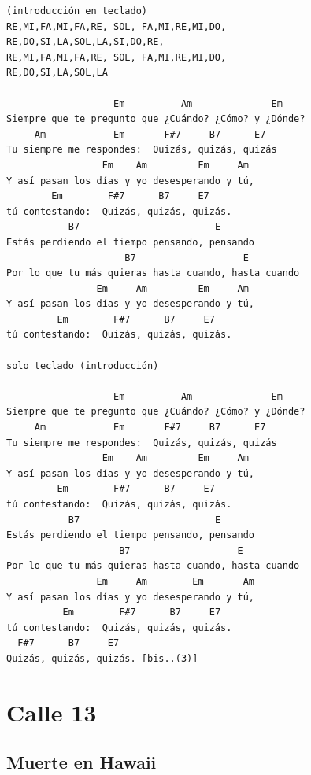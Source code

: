 \documentclass[a4paper]{article}
\begin{document}
\begin{Verbatim}[commandchars=\\\{\}]
(introducción en teclado)
RE,MI,FA,MI,FA,RE, SOL, FA,MI,RE,MI,DO,
RE,DO,SI,LA,SOL,LA,SI,DO,RE,
RE,MI,FA,MI,FA,RE, SOL, FA,MI,RE,MI,DO,
RE,DO,SI,LA,SOL,LA

                   Em          Am              Em
Siempre que te pregunto que ¿Cuándo? ¿Cómo? y ¿Dónde?
     Am            Em       F#7     B7      E7
Tu siempre me respondes:  Quizás, quizás, quizás
                 Em    Am         Em     Am
Y así pasan los días y yo desesperando y tú,
        Em        F#7      B7     E7
tú contestando:  Quizás, quizás, quizás.
           B7                        E
Estás perdiendo el tiempo pensando, pensando
                     B7                   E
Por lo que tu más quieras hasta cuando, hasta cuando
                Em     Am         Em     Am
Y así pasan los días y yo desesperando y tú,
         Em        F#7      B7     E7
tú contestando:  Quizás, quizás, quizás.

solo teclado (introducción)

                   Em          Am              Em
Siempre que te pregunto que ¿Cuándo? ¿Cómo? y ¿Dónde?
     Am            Em       F#7     B7      E7
Tu siempre me respondes:  Quizás, quizás, quizás
                 Em    Am         Em     Am
Y así pasan los días y yo desesperando y tú,
         Em        F#7      B7     E7
tú contestando:  Quizás, quizás, quizás.
           B7                        E
Estás perdiendo el tiempo pensando, pensando
                    B7                   E
Por lo que tu más quieras hasta cuando, hasta cuando
                Em     Am        Em       Am
Y así pasan los días y yo desesperando y tú,
          Em        F#7      B7     E7
tú contestando:  Quizás, quizás, quizás.
  F#7      B7     E7
Quizás, quizás, quizás. [bis..(3)]
\end{Verbatim}
\newpage
\section{Calle 13} %
\label{sec:Calle 13}
\subsection{Muerte en Hawaii} %
\label{sub:Muerte en Hawaii}
\end{document}
